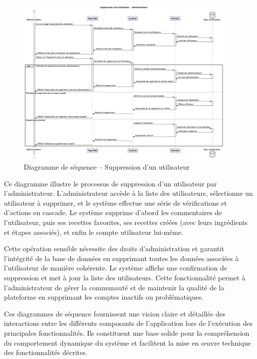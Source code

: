 \documentclass[12pt,a4paper]{report}
\begin{document}
\begin{figure}[H]
    \centering
    \includegraphics[width=0.95\textwidth]{sequence_diagram_suppression_utilisateur.png}
    \caption{Diagramme de séquence – Suppression d'un utilisateur}
    \label{fig:sequence_suppression_utilisateur}
\end{figure}

Ce diagramme illustre le processus de suppression d'un utilisateur par l'administrateur. L'administrateur accède à la liste des utilisateurs, sélectionne un utilisateur à supprimer, et le système effectue une série de vérifications et d'actions en cascade. Le système supprime d'abord les commentaires de l'utilisateur, puis ses recettes favorites, ses recettes créées (avec leurs ingrédients et étapes associés), et enfin le compte utilisateur lui-même.

Cette opération sensible nécessite des droits d'administration et garantit l'intégrité de la base de données en supprimant toutes les données associées à l'utilisateur de manière cohérente. Le système affiche une confirmation de suppression et met à jour la liste des utilisateurs. Cette fonctionnalité permet à l'administrateur de gérer la communauté et de maintenir la qualité de la plateforme en supprimant les comptes inactifs ou problématiques.

Ces diagrammes de séquence fournissent une vision claire et détaillée des interactions entre les différents composants de l'application lors de l'exécution des principales fonctionnalités. Ils constituent une base solide pour la compréhension du comportement dynamique du système et facilitent la mise en œuvre technique des fonctionnalités décrites.
\end{document}
